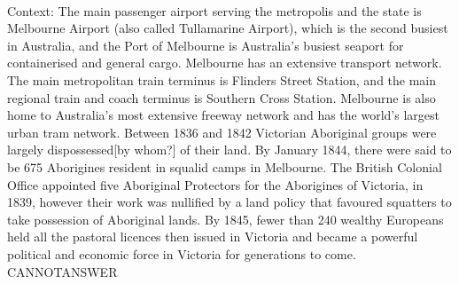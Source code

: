 \documentclass[11pt,a4paper, onecolumn]{article}
\begin{document}
\\ Context: The main passenger airport serving the metropolis and the state is Melbourne Airport (also called Tullamarine Airport), which is the second busiest in Australia, and the Port of Melbourne is Australia's busiest seaport for containerised and general cargo. Melbourne has an extensive transport network. The main metropolitan train terminus is Flinders Street Station, and the main regional train and coach terminus is Southern Cross Station. Melbourne is also home to Australia's most extensive freeway network and has the world's largest urban tram network. Between 1836 and 1842 Victorian Aboriginal groups were largely dispossessed[by whom?] of their land. By January 1844, there were said to be 675 Aborigines resident in squalid camps in Melbourne. The British Colonial Office appointed five Aboriginal Protectors for the Aborigines of Victoria, in 1839, however their work was nullified by a land policy that favoured squatters to take possession of Aboriginal lands. By 1845, fewer than 240 wealthy Europeans held all the pastoral licences then issued in Victoria and became a powerful political and economic force in Victoria for generations to come. CANNOTANSWER
\end{document}

